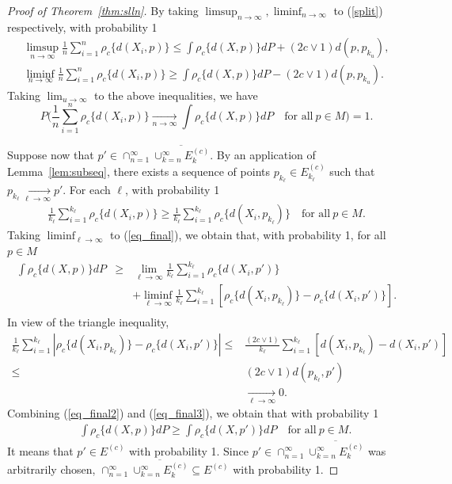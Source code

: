 \documentclass[preprint]{imsart}
\theoremstyle{plain}
\theoremstyle{remark}
\begin{document}
\begin{appendix}
\begin{proof}[Proof of Theorem~\ref{thm:slln}]
By taking $\limsup_{n \rightarrow \infty}, \liminf_{n \rightarrow \infty}$ to (\ref{split}) respectively, with probability 1  
\begin{eqnarray*}
\limsup_{n \rightarrow \infty} \frac{1}{n} \sum_{i=1}^{n} \rho_{c}\{d(X_i, p)\} \le \int \rho_{c}\{d(X, p)\}dP + (2c \lor 1) d(p, p_{k_{u}}),  \\
\liminf_{n \rightarrow \infty} \frac{1}{n} \sum_{i=1}^{n} \rho_{c}\{d(X_i, p)\} \ge \int \rho_{c}\{d(X, p)\}dP - (2c \lor 1) d(p, p_{k_{u}}).  
\end{eqnarray*}
Taking $\lim_{u \rightarrow \infty}$ to the above inequalities, we have
\[
P\big(\frac{1}{n}\sum_{i=1}^{n} \rho_{c}\{d(X_i, p)\} \underset{n \rightarrow \infty}{\rightarrow} \int \rho_{c}\{d(X, p)\} dP \quad \mbox{for all}~ p \in M \big) = 1.
\]

Suppose now that $p' \in \cap_{n=1}^{\infty} \overline{\cup_{k=n}^{\infty} E^{(c)}_{k}}$. By an application of Lemma~\ref{lem:subseq}, there exists a sequence of points $p_{k_{\ell}} \in E^{(c)}_{k_{\ell}}$ such that $p_{k_{\ell}} \underset{\ell \rightarrow \infty}{\rightarrow} p'$. For each $\ell$, with probability 1
\begin{eqnarray}\label{eq_final}
\frac{1}{k_{\ell}}\sum_{i=1}^{k_{\ell}}\rho_{c}\{d(X_i, p)\} \ge \frac{1}{k_{\ell}} \sum_{i=1}^{k_{\ell}}\rho_{c}\{d(X_i, p_{k_{\ell}})\} \quad \mbox{for all} ~ p \in M.
\end{eqnarray}
Taking $\liminf_{\ell \rightarrow \infty}$ to (\ref{eq_final}), we obtain that, with probability 1, for all $p \in M$
\begin{eqnarray}\label{eq_final2}
\int \rho_{c}\{d(X, p)\}dP &\ge& \lim_{\ell \rightarrow \infty} \frac{1}{k_{\ell}}\sum_{i=1}^{k_{\ell}}\rho_{c}\{d(X_i, p')\} \nonumber \\
& & + \liminf_{\ell \rightarrow \infty} \frac{1}{k_{\ell}}\sum_{i=1}^{k_{\ell}}[\rho_{c}\{d(X_i, p_{k_{\ell}})\} - \rho_{c}\{d(X_i, p')\}]. \nonumber \\
\end{eqnarray}
In view of the triangle inequality,
\begin{align}
\frac{1}{k_{\ell}}\sum_{i=1}^{k_{\ell}}|\rho_{c}\{d(X_i, p_{k_{\ell}})\} - \rho_{c}\{d(X_i, p')\}| \le& \frac{(2c \lor 1)}{k_{\ell}}\sum_{i=1}^{k_{\ell}}[d(X_{i}, p_{k_{\ell}}) - d(X_{i}, p')] \nonumber \\
\le& (2c \lor 1) d(p_{k_{\ell}}, p') \nonumber \\    &\underset{\ell \rightarrow \infty}{\rightarrow} 0.  \label{eq_final3} 
\end{align}
Combining (\ref{eq_final2}) and (\ref{eq_final3}), we obtain that with probability 1
\begin{eqnarray*}
&& \int \rho_{c}\{d(X, p)\}dP \ge \int \rho_{c}\{d(X, p')\}dP \quad \mbox{for all} ~ p \in M.
\end{eqnarray*}
It means that $p' \in E^{(c)}$ with probability 1. Since $p' \in \cap_{n=1}^{\infty} \overline{\cup_{k=n}^{\infty} E^{(c)}_{k}}$ was arbitrarily chosen,  $\cap_{n=1}^{\infty}\overline{\cup_{k=n}^{\infty} E^{(c)}_{k}} \subseteq E^{(c)}$ with probability 1.


\end{proof}
\end{appendix}
\end{document}
